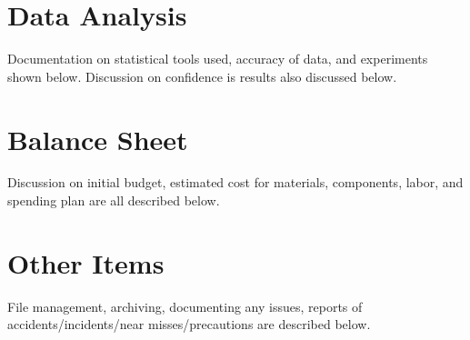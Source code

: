 \documentclass[12pt]{article}
\begin{document}
	\newpage	
	
	\section{Data Analysis}
	Documentation on statistical tools used, accuracy of data, and experiments shown below. Discussion on confidence is results also discussed below.
		
	\newpage
	
	\section{Balance Sheet}
	Discussion on initial budget, estimated cost for materials, components, labor, and spending plan are all described below.
		
	\newpage				
						
	\section{Other Items}
	File management, archiving, documenting any issues, reports of accidents/incidents/near misses/precautions are described below.
\end{document}
